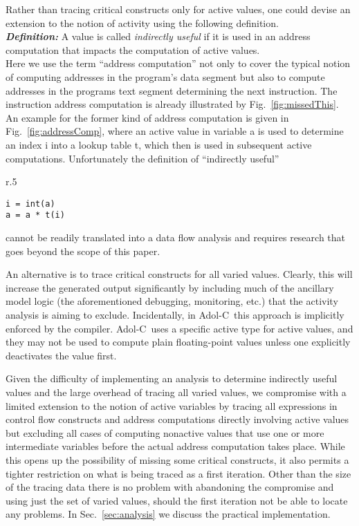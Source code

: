 \documentclass{article}
\newcommand{\adolc}{\mbox{Adol-C}}
\newcommand{\refsec}[1]{{Sec.~\ref{#1}}}
\newcommand{\reffig}[1]{{Fig.~\ref{#1}}}
\begin{document}
Rather than tracing critical constructs only for  active values, 
one could devise an extension to the notion of activity using the following 
definition.\\
{\bf\em  Definition: } A value is called {\em indirectly useful} 
if it is used in an address computation that impacts 
the  computation of active values.\\
Here we use the term  ``address computation'' not only  to cover the typical notion of 
computing addresses in the program's data segment but also to compute 
addresses in the programs text segment determining the next instruction. 
The instruction address computation is already illustrated by \reffig{fig:missedThis}.
An example for the former kind of address computation is given in 
\reffig{fig:addressComp}, where an active value in variable a is used to 
determine an index i into a lookup table t, which then is used in 
subsequent active computations.
Unfortunately the definition of ``indirectly useful'' 
\begin{wrapfigure}{r}{.5\textwidth}
\begin{minipage}{.95\linewidth}
\begin{lstlisting}[frame=single]
i = int(a) 
a = a * t(i)
\end{lstlisting}
\end{minipage}
\caption{An address computation into a lookup table impacting the subsequent computation}\label{fig:addressComp} 
\end{wrapfigure}
cannot be readily translated  into a data flow analysis and requires research that goes beyond the scope of this paper.   

An alternative is  to  trace critical constructs for all varied values. 
Clearly, this will increase the generated output significantly by including much 
of the ancillary model logic (the aforementioned debugging, monitoring, etc.) that 
the activity analysis is aiming to exclude. 
Incidentally, in \adolc\ this approach is implicitly enforced by the compiler. 
\adolc\ uses a specific  
active type for active values, and they may not be used to 
compute plain floating-point values unless one 
explicitly deactivates the value first. 

Given the difficulty of implementing an analysis to determine indirectly useful values 
and the large overhead of tracing all varied values, we 
compromise with a limited extension to the notion of active variables by tracing  
all expressions in control flow constructs and address computations directly involving active values
but excluding all cases of computing nonactive values that use one or more intermediate 
variables before the actual address computation takes place. 
While this opens up the possibility of missing some critical constructs, 
it also permits a tighter restriction on what is being traced as a first iteration. 
Other than the size of the tracing data  there is no problem with abandoning the compromise
and using just the set of varied values, should the first iteration not be able to 
locate any problems.    
In \refsec{sec:analysis} we discuss the practical implementation.
\end{document}
